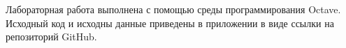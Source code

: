 \documentclass[../body.tex]{subfiles}
\begin{document}
	Лабораторная работа выполнена с помощью среды программирования Octave.
    \\Исходный код и исходны данные приведены в приложении в виде ссылки на репозиторий GitHub.
\end{document}
